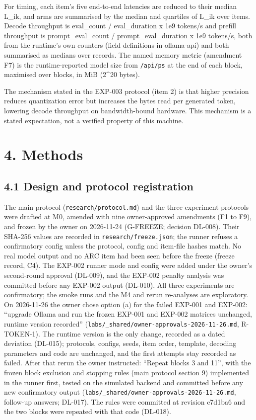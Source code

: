 \documentclass[
]{article}
\begin{document}
For timing, each item's five end-to-end latencies are reduced to their
median L\_ik, and arms are summarised by the median and quartiles of
L\_ik over items. Decode throughput is eval\_count / eval\_duration x
1e9 tokens/s and prefill throughput is prompt\_eval\_count /
prompt\_eval\_duration x 1e9 tokens/s, both from the runtime's own
counters (field definitions in ollama-api) and both summarised as
medians over records. The named memory metric (amendment F7) is the
runtime-reported model size from \texttt{/api/ps} at the end of each
block, maximised over blocks, in MiB (2\^{}20 bytes).

The mechanism stated in the EXP-003 protocol (item 2) is that higher
precision reduces quantization error but increases the bytes read per
generated token, lowering decode throughput on bandwidth-bound hardware.
This mechanism is a stated expectation, not a verified property of this
machine.

\section{4. Methods}\label{methods}

\subsection{4.1 Design and protocol
registration}\label{design-and-protocol-registration}

The main protocol (\texttt{research/protocol.md}) and the three
experiment protocols were drafted at M0, amended with nine
owner-approved amendments (F1 to F9), and frozen by the owner on
2026-11-24 (G-FREEZE; decision DL-008). Their SHA-256 values are
recorded in \texttt{research/freeze.json}; the runner refuses a
confirmatory config unless the protocol, config and item-file hashes
match. No real model output and no ARC item had been seen before the
freeze (freeze record, C4). The EXP-002 runner mode and config were
added under the owner's second-round approval (DL-009), and the EXP-002
penalty analysis was committed before any EXP-002 output (DL-010). All
three experiments are confirmatory; the smoke runs and the M4 and rerun
re-analyses are exploratory. On 2026-11-26 the owner chose option (a)
for the failed EXP-001 and EXP-002: ``upgrade Ollama and run the frozen
EXP-001 and EXP-002 matrices unchanged, runtime version recorded''
(\texttt{labs/\_shared/owner-approvals-2026-11-26.md}, R-TOKEN-1). The
runtime version is the only change, recorded as a dated deviation
(DL-015); protocols, configs, seeds, item order, template, decoding
parameters and code are unchanged, and the first attempts stay recorded
as failed. After that rerun the owner instructed: ``Repeat blocks 3 and
11'', with the frozen block exclusion and stopping rules (main protocol
section 9) implemented in the runner first, tested on the simulated
backend and committed before any new confirmatory output
(\texttt{labs/\_shared/owner-approvals-2026-11-26.md}, follow-up
answers; DL-017). The rules were committed at revision c7d1ba6 and the
two blocks were repeated with that code (DL-018).
\end{document}
